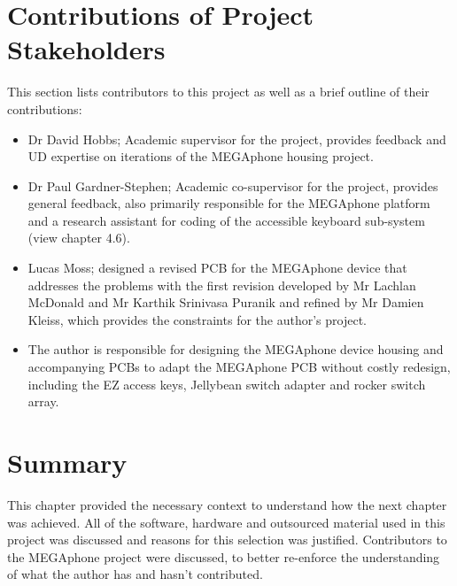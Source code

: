 \section{Contributions of Project Stakeholders} 

This section lists contributors to this project as well as a brief outline of their contributions:

\begin{itemize} 
    \item Dr David Hobbs; Academic supervisor for the project, provides feedback and UD expertise on iterations of the MEGAphone housing project.
    \item Dr Paul Gardner-Stephen; Academic co-supervisor for the project, provides general feedback, also primarily responsible for the MEGAphone platform and a research assistant for coding of the accessible keyboard sub-system (view chapter 4.6).
    \item Lucas Moss; designed a revised PCB for the MEGAphone device that addresses the problems with the first revision developed by Mr Lachlan McDonald and Mr Karthik Srinivasa Puranik and refined by Mr Damien Kleiss, which provides the constraints for the author's project.
    \item The author is responsible for designing the MEGAphone device housing and accompanying PCBs to adapt the MEGAphone PCB without costly redesign, including the EZ access keys, Jellybean switch adapter and rocker switch array.
\end{itemize}

\section{Summary}

This chapter provided the necessary context to understand how the next chapter was achieved.
All of the software, hardware and outsourced material used in this project was discussed and reasons for this selection was justified.
Contributors to the MEGAphone project were discussed, to better re-enforce the understanding of what the author has and hasn't contributed.
